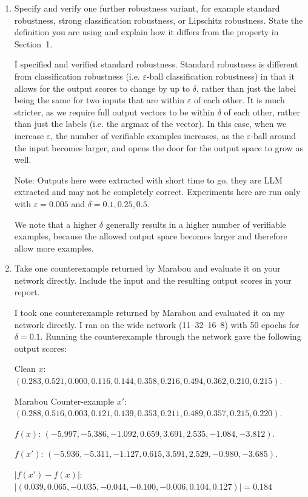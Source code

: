 \documentclass[11pt,a4paper]{article}
\begin{document}
\begin{enumerate}[leftmargin=*]
  \item Specify and verify one further robustness variant, for example standard robustness, strong classification robustness, or Lipschitz robustness. State the definition you are using and explain how it differs from the property in Section~1.
  \begin{itshape}
  I specified and verified standard robustness.
  Standard robustness is different from classification robustness (i.e. $\varepsilon$-ball classification robustness)
  in that it allows for the output scores to change by up to $\delta$, rather than just the label being the same
  for two inputs that are within $\varepsilon$ of each other.
  It is much stricter, as we require full output vectors to be within $\delta$ of each other, rather than just the labels (i.e. the argmax of the vector).
  In this case, when we increase $\varepsilon$, the number of verifiable examples increases, as the $\varepsilon$-ball around the input becomes larger,
  and opens the door for the output space to grow as well.

  Note: Outputs here were extracted with short time to go, they are LLM extracted
  and may not be completely correct. Experiments here are run only with $\varepsilon = 0.005$ and $\delta = 0.1, 0.25, 0.5$.

  We note that a higher $\delta$ generally results in a higher number of verifiable examples,
  because the allowed output space becomes larger and therefore allow more examples.
  \end{itshape}

  \item Take one counterexample returned by Marabou and evaluate it on your network directly. Include the input and the resulting output scores in your report.
  \begin{itshape}
  I took one counterexample returned by Marabou and evaluated it on my network directly.
  I ran on the wide network (11--32--16--8) with 50 epochs for $\delta = 0.1$.
  Running the counterexample through the network gave the following output scores:

  Clean $x$: $(0.283, 0.521, 0.000, 0.116, 0.144, 0.358, 0.216, 0.494, 0.362, 0.210, 0.215)$.

  Marabou Counter-example $x'$: $(0.288, 0.516, 0.003, 0.121, 0.139, 0.353, 0.211, 0.489, 0.357, 0.215, 0.220)$.

  $f(x)$: $(-5.997, -5.386, -1.092, 0.659, 3.691, 2.535, -1.084, -3.812)$.

  $f(x')$: $(-5.936, -5.311, -1.127, 0.615, 3.591, 2.529, -0.980, -3.685)$.

  $|f(x')-f(x)|$: $|(0.039, 0.065, -0.035, -0.044, -0.100, -0.006, 0.104, 0.127)| = 0.184$

  \end{itshape}
\end{enumerate}
\end{document}
